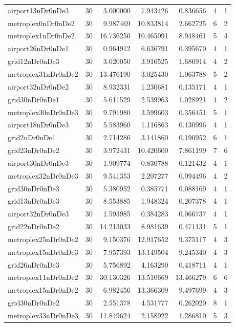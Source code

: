 \begin{longtable}{|l|r|r|r|r|r|r|}
airport13nDr0nDe3 & 30 & 3.000000 & 7.943426 & 0.836656 & 4 & 1 \\
metroplex0nDr0nDe2 & 30 & 9.987469 & 10.833814 & 2.662725 & 6 & 2 \\
metroplex1nDr0nDe2 & 30 & 16.736250 & 10.465091 & 8.948461 & 5 & 4 \\
airport26nDr0nDe1 & 30 & 0.964912 & 6.636791 & 0.395670 & 4 & 1 \\
grid12nDr0nDe3 & 30 & 3.020050 & 3.916525 & 1.686914 & 4 & 2 \\
metroplex31nDr0nDe2 & 30 & 13.476190 & 3.025430 & 1.063788 & 5 & 2 \\
airport32nDr0nDe2 & 30 & 8.932331 & 1.230681 & 0.135171 & 4 & 1 \\
grid30nDr0nDe1 & 30 & 5.611529 & 2.539963 & 1.028921 & 4 & 2 \\
metroplex30nDr0nDe3 & 30 & 9.791980 & 3.599603 & 0.356451 & 5 & 1 \\
airport18nDr0nDe3 & 30 & 5.583960 & 1.116863 & 0.130996 & 4 & 1 \\
grid2nDr0nDe1 & 30 & 2.714286 & 3.141860 & 0.190952 & 6 & 1 \\
grid23nDr0nDe2 & 30 & 3.972431 & 10.420600 & 7.861199 & 7 & 6 \\
airport30nDr0nDe3 & 30 & 1.909774 & 0.830788 & 0.121432 & 4 & 1 \\
metroplex32nDr0nDe3 & 30 & 9.541353 & 2.207277 & 0.994496 & 4 & 2 \\
grid30nDr0nDe3 & 30 & 5.380952 & 0.385771 & 0.088169 & 4 & 1 \\
grid13nDr0nDe3 & 30 & 8.553885 & 1.948324 & 0.207378 & 4 & 1 \\
airport32nDr0nDe3 & 30 & 1.593985 & 0.384283 & 0.066737 & 4 & 1 \\
grid22nDr0nDe2 & 30 & 14.213033 & 8.981639 & 0.471131 & 5 & 1 \\
metroplex25nDr0nDe2 & 30 & 9.150376 & 12.917652 & 9.375117 & 4 & 3 \\
metroplex15nDr0nDe3 & 30 & 7.957393 & 13.149504 & 9.245340 & 4 & 3 \\
grid26nDr0nDe3 & 30 & 5.756892 & 4.163290 & 0.418711 & 4 & 1 \\
metroplex11nDr0nDe2 & 30 & 30.130326 & 13.510669 & 13.466279 & 6 & 6 \\
metroplex15nDr0nDe2 & 30 & 6.982456 & 13.366309 & 9.497699 & 4 & 3 \\
grid30nDr0nDe2 & 30 & 2.551378 & 4.531777 & 0.262020 & 8 & 1 \\
metroplex33nDr0nDe3 & 30 & 11.849624 & 2.158922 & 1.286810 & 5 & 3 \\

\end{longtable}
